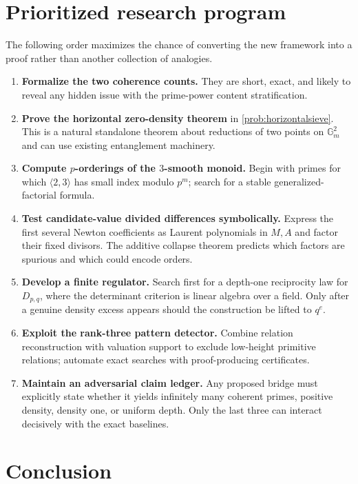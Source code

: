 \documentclass[11pt]{article}
\theoremstyle{definition}
\theoremstyle{remark}
\begin{document}
\section{Prioritized research program}
\label{sec:program}

The following order maximizes the chance of converting the new framework into a proof rather than
another collection of analogies.

\begin{enumerate}[leftmargin=2.2em]
\item \textbf{Formalize the two coherence counts.}  They are short, exact, and likely to reveal
      any hidden issue with the prime-power content stratification.
\item \textbf{Prove the horizontal zero-density theorem} in \cref{prob:horizontalsieve}.  This
      is a natural standalone theorem about reductions of two points on $\mathbb G_m^2$ and can
      use existing entanglement machinery.
\item \textbf{Compute $p$-orderings of the $3$-smooth monoid.}  Begin with primes for which
      $\langle2,3\rangle$ has small index modulo $p^m$; search for a stable generalized-factorial
      formula.
\item \textbf{Test candidate-value divided differences symbolically.}  Express the first several
      Newton coefficients as Laurent polynomials in $M,A$ and factor their fixed divisors.  The
      additive collapse theorem predicts which factors are spurious and which could encode orders.
\item \textbf{Develop a finite regulator.}  Search first for a depth-one reciprocity law for
      $D_{p,q}$, where the determinant criterion is linear algebra over a field.  Only after a
      genuine density excess appears should the construction be lifted to $q^e$.
\item \textbf{Exploit the rank-three pattern detector.}  Combine relation reconstruction with
      valuation support to exclude low-height primitive relations; automate exact searches with
      proof-producing certificates.
\item \textbf{Maintain an adversarial claim ledger.}  Any proposed bridge must explicitly state
      whether it yields infinitely many coherent primes, positive density, density one, or uniform
      depth.  Only the last three can interact decisively with the exact baselines.
\end{enumerate}

\section{Conclusion}
\end{document}
